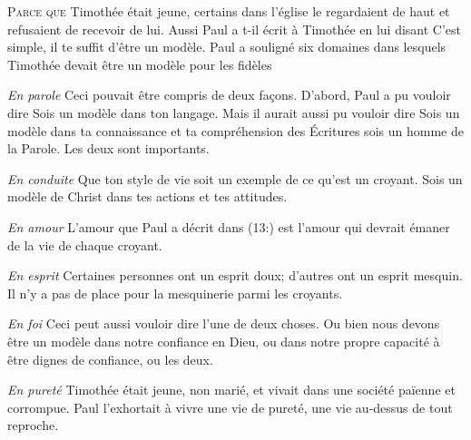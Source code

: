 \lettrine{P}{arce que} Timothée était jeune, certains dans l'église
 le regardaient de haut et refusaient de recevoir de lui.
 Aussi Paul a t-il écrit à Timothée en lui disant\frcolon{} 
 \Og C'est simple, il te suffit d'être un modèle. \Fg{}
 Paul a souligné six domaines dans lesquels Timothée
 devait être un modèle pour les fidèles\frcolon{}


\emph{En parole} \ocadr
 Ceci pouvait être compris de deux fa\c{c}ons.
 D'abord, Paul a pu vouloir dire\frcolon{} 
 \Og Sois un modèle dans ton langage. \Fg{}
 Mais il aurait aussi pu vouloir dire\frcolon{} 
 \Og Sois un modèle dans ta connaissance et ta compréhension des Écritures
 \ocadr sois un homme de la Parole. \Fg{} Les deux sont importants.

\emph{En conduite} \ocadr
 Que ton style de vie soit un exemple de ce qu'est un croyant.
 Sois un modèle de Christ dans tes actions et tes attitudes.

\emph{En amour} \ocadr
 L'amour que Paul a décrit dans (13:) 
 est l'amour qui devrait émaner de la vie de chaque croyant.

\emph{En esprit} \ocadr
 Certaines personnes ont un esprit doux; d'autres ont un esprit mesquin.
 Il n'y a pas de place pour la mesquinerie parmi les croyants.

\emph{En foi} \ocadr
 Ceci peut aussi vouloir dire l'une de deux choses.
 Ou bien nous devons être un modèle dans notre confiance en Dieu,
 ou dans notre propre capacité à être dignes de confiance, ou les deux.

\emph{En pureté} \ocadr
 Timothée était jeune, non marié, et vivait dans une société païenne
 et corrompue. Paul l'exhortait à vivre une vie de pureté,
 une vie au-dessus de tout reproche.



\dvrule




